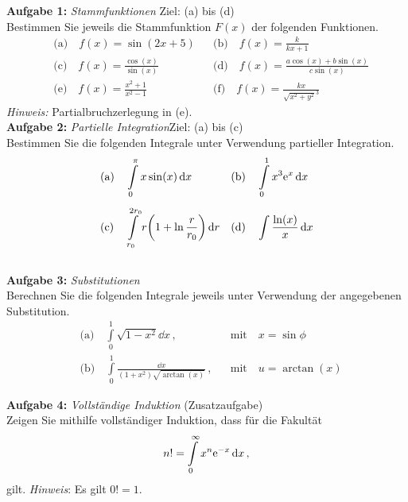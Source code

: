 
\textbf{Aufgabe 1: } \emph{Stammfunktionen} \hfill Ziel: (a) bis (d)\\[0.2cm]
Bestimmen Sie jeweils die Stammfunktion $F(x)$ der folgenden Funktionen.
\begin{align*}
    &\text{(a)}\quad f(x)=\sin(2x+5)                && \text{(b)}\quad f(x)=\frac{k}{kx+1}\\[1ex]
    &\text{(c)}\quad f(x)=\frac{\cos(x)}{\sin(x)}	&& \text{(d)}\quad f(x)=\frac{a\cos(x)+b\sin(x)}{c\sin(x)}\\[1ex]
    &\text{(e)}\quad f(x)=\frac{x^2+1}{x^2-1}       && \text{(f)}\quad f(x)=\frac{kx}{\sqrt{x^2+y^2}^3}
\end{align*}    
\emph{Hinweis:} Partialbruchzerlegung in (e).\\[1cm]
%
\textbf{Aufgabe 2: } \emph{Partielle Integration}\hfill Ziel: (a) bis (c)\\[0.2cm]
Bestimmen Sie die folgenden Integrale unter Verwendung partieller Integration.
\begin{align*}
    &\text{(a)}\quad \int\limits_0^\pi x\sin(x)\dd{x}	&& \text{(b)}\quad \int\limits_0^1 x^3\mathrm{e}^{x}\dd{x}\\[1ex]
    &\text{(c)}\quad \int\limits_{r_0}^{2r_0} r\qty(1+\ln\frac{r}{r_0})\dd{r}	&& \text{(d)}\quad \int\frac{\ln(x)}{x}\dd{x}
\end{align*}\\[0.8cm]
%
\textbf{Aufgabe 3: } \emph{Substitutionen}\\[0.2cm]
Berechnen Sie die folgenden Integrale jeweils unter Verwendung der angegebenen Substitution.
\begin{align*}
    &\text{(a)}\quad \int\limits_0^1 \sqrt{1-x^2}\dd{x}\,,		&&\text{mit}\quad x=\sin\phi\\[1ex]
    &\text{(b)}\quad \int\limits_0^1 \frac{\dd{x}}{(1+x^2)\sqrt{\arctan(x)}}	\,,	&&\text{mit}\quad u=\arctan(x)
\end{align*}
%

\newpage\noindent
\textbf{Aufgabe 4: } \emph{Vollständige Induktion} \hfill (Zusatzaufgabe)\\[0.2cm]
Zeigen Sie mithilfe vollständiger Induktion, dass für die Fakultät
\begin{align*}
        n! = \int\limits_{0}^{\infty} x^n \mathrm{e}^{-x} \dd{x},
\end{align*}
gilt. \emph{Hinweis}: Es gilt $0! = 1$.


